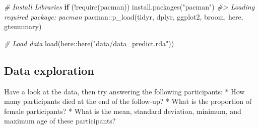 \documentclass[
]{article}
\newenvironment{Shaded}{\begin{snugshade}}{\end{snugshade}}
\newcommand{\CommentTok}[1]{\textcolor[rgb]{0.56,0.35,0.01}{\textit{#1}}}
\newcommand{\ControlFlowTok}[1]{\textcolor[rgb]{0.13,0.29,0.53}{\textbf{#1}}}
\newcommand{\FunctionTok}[1]{\textcolor[rgb]{0.00,0.00,0.00}{#1}}
\newcommand{\NormalTok}[1]{#1}
\newcommand{\SpecialCharTok}[1]{\textcolor[rgb]{0.00,0.00,0.00}{#1}}
\newcommand{\StringTok}[1]{\textcolor[rgb]{0.31,0.60,0.02}{#1}}
\begin{document}
\begin{Shaded}
\begin{Highlighting}[]
\CommentTok{\# Install Libraries}
\ControlFlowTok{if}\NormalTok{ (}\SpecialCharTok{!}\FunctionTok{require}\NormalTok{(pacman)) }\FunctionTok{install.packages}\NormalTok{(}\StringTok{"pacman"}\NormalTok{)}
\CommentTok{\#\textgreater{} Loading required package: pacman}
\NormalTok{pacman}\SpecialCharTok{::}\FunctionTok{p\_load}\NormalTok{(tidyr, dplyr, ggplot2, broom, here, gtsummary)}

\CommentTok{\# Load data}
\FunctionTok{load}\NormalTok{(here}\SpecialCharTok{::}\FunctionTok{here}\NormalTok{(}\StringTok{"data/data\_predict.rda"}\NormalTok{))}
\end{Highlighting}
\end{Shaded}

\hypertarget{data-exploration}{%
\subsection{Data exploration}\label{data-exploration}}

Have a look at the data, then try answering the following participants:
* How many participants died at the end of the follow-up? * What is the
proportion of female participants? * What is the mean, standard
deviation, minimum, and maximum age of these participants?
\end{document}
